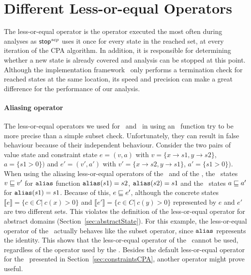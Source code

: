\section{Different Less-or-equal Operators}
\label{sec:leqOperators}
The less-or-equal operator is the operator executed the most often during analyses as $\operatorname{\operatorname{\mathsf{stop}}}^{sep}$ uses it once for every state in the reached set, at every iteration of the CPA algorithm.
In addition, it is responsible for determining whether a new state is already covered and analysis can be stopped at this point.
Although the implementation framework \cpaChecker\ only performs a termination check for reached states at the same location, 
its speed and precision can make a great difference for the performance of our analysis.

\paragraph*{Aliasing operator}
The  less-or-equal operators we used for \symbolicValueAnalysisCPA\ and \constraintsCPA\ in \cite{Lemberger2015} using an \aliasFunc\ function try to be more precise than a simple subset check.
Unfortunately, they can result in false behaviour because of their independent behaviour.
Consider the two pairs of value state and constraint state
$e = (v, a)$ with $v = \{x \rightarrow s1, y \rightarrow s2\}$, $a = \{s1 > 0\})$ and
$e' = (v', a')$ with $v' = \{x \rightarrow s2, y \rightarrow s1\}$, $a' = \{s1 > 0\})$.
When using the aliasing less-or-equal operators of the \symbolicValueAnalysisCPA\ and of the \constraintsCPA,
the \symbolicValueAnalysisCPA\ states
$v \sqsubseteq v'$ for $\texttt{alias}$ function $\texttt{alias}(s1) = s2$, $\texttt{alias}(s2) = s1$ and
the \constraintsCPA\ states
$a \sqsubseteq a'$ for $\texttt{alias}(s1) = s1$.
Because of this, $e \sqsubseteq e'$, although the concrete states
$\llbracket e \rrbracket = \{ c \in C |\ c(x) > 0 \}$ and
$\llbracket e' \rrbracket = \{ c \in C |\ c(y) > 0 \}$
represented by $e$ and $e'$ are two different sets.
This violates the definition of the less-or-equal operator for abstract domains (Section~\ref{sec:abstractState}).
For this example, the less-or-equal operator of the \constraintsCPA\ actually behaves like the subset operator, since $\texttt{alias}$ represents the identity.
This shows that the less-or-equal operator of the \symbolicValueAnalysisCPA\ cannot be used, regardless of the operator used by the \constraintsCPA.
Besides the default less-or-equal operator for the \constraintsCPA\ 
presented in Section~\ref{sec:constraintsCPA}, another operator might prove useful.

